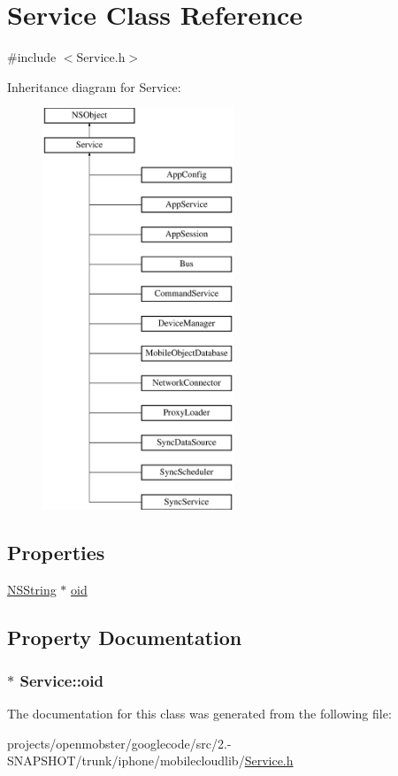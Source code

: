 \hypertarget{interface_service}{
\section{\-Service \-Class \-Reference}
\label{interface_service}
}


{\ttfamily \#include $<$\-Service.\-h$>$}

\-Inheritance diagram for \-Service\-:\begin{figure}[H]
\begin{center}
\leavevmode
\includegraphics[height=12.000000cm]{interface_service}
\end{center}
\end{figure}
\subsection*{\-Properties}
\begin{DoxyCompactItemize}
\item 
\hyperlink{class_n_s_string}{\-N\-S\-String} $\ast$ \hyperlink{interface_service_ab6290a3ae05b712a382ee07cbee0fd03}{oid}
\end{DoxyCompactItemize}


\subsection{\-Property \-Documentation}
\hypertarget{interface_service_ab6290a3ae05b712a382ee07cbee0fd03}{
\subsubsection[{oid}]{ $\ast$ \-Service\-::oid}}
\label{interface_service_ab6290a3ae05b712a382ee07cbee0fd03}


\-The documentation for this class was generated from the following file\-:\begin{DoxyCompactItemize}
\item 
projects/openmobster/googlecode/src/2.-\/\-S\-N\-A\-P\-S\-H\-O\-T/trunk/iphone/mobilecloudlib/\hyperlink{_service_8h}{\-Service.\-h}\end{DoxyCompactItemize}
